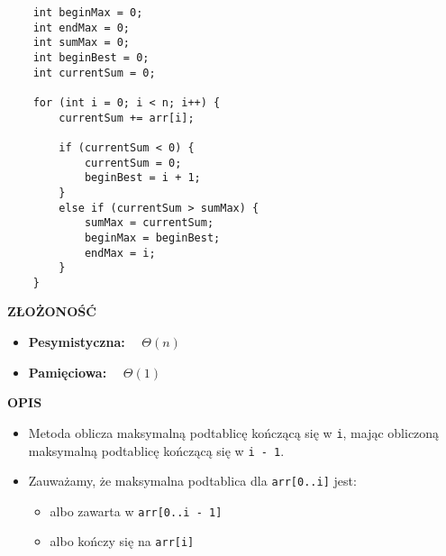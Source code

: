 \documentclass[../algorytmy.tex]{subfiles}
\begin{document}
    \begin{verbatim}
    int beginMax = 0;
    int endMax = 0;
    int sumMax = 0;
    int beginBest = 0;
    int currentSum = 0;

    for (int i = 0; i < n; i++) {
        currentSum += arr[i];

        if (currentSum < 0) {
            currentSum = 0;
            beginBest = i + 1;
        }
        else if (currentSum > sumMax) {
            sumMax = currentSum;
            beginMax = beginBest;
            endMax = i;
        }
    }
    \end{verbatim}

    \textbf{ZŁOŻONOŚĆ}
    \begin{itemize}
        \item \textbf{Pesymistyczna:} ~~$\Theta(n)$
        \item \textbf{Pamięciowa:} ~~$\Theta(1)$
    \end{itemize}

    \textbf{OPIS}
    \begin{itemize}
        \item Metoda oblicza maksymalną podtablicę kończącą się w \texttt{i},
            mając obliczoną maksymalną podtablicę kończącą się w \texttt{i - 1}.
        \item Zauważamy, że maksymalna podtablica dla \texttt{arr[0..i]} jest:
            \begin{itemize}
                \item albo zawarta w \texttt{arr[0..i - 1]}
                \item albo kończy się na \texttt{arr[i]}
            \end{itemize}
    \end{itemize}

    \pagebreak
\end{document}
